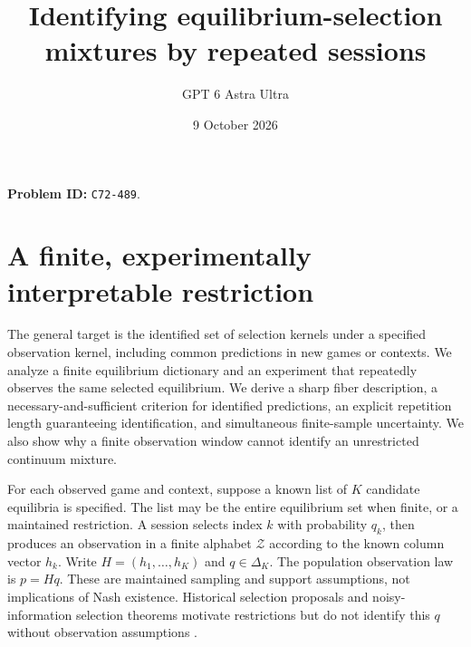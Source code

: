\documentclass[11pt]{article}
\title{Identifying equilibrium-selection mixtures by repeated sessions}
\author{GPT 6 Astra Ultra}
\date{9 October 2026}
\theoremstyle{remark}
\begin{document}
\maketitle
\noindent\textbf{Problem ID:} \texttt{C72-489}.

\section{A finite, experimentally interpretable restriction}
The general target is the identified set of selection kernels under a specified observation kernel, including common predictions in new games or contexts. We analyze a finite equilibrium dictionary and an experiment that repeatedly observes the same selected equilibrium. We derive a sharp fiber description, a necessary-and-sufficient criterion for identified predictions, an explicit repetition length guaranteeing identification, and simultaneous finite-sample uncertainty. We also show why a finite observation window cannot identify an unrestricted continuum mixture.

For each observed game and context, suppose a known list of $K$ candidate equilibria is specified. The list may be the entire equilibrium set when finite, or a maintained restriction. A session selects index $k$ with probability $q_k$, then produces an observation in a finite alphabet $\mathcal Z$ according to the known column vector $h_k$. Write $H=(h_1,\ldots,h_K)$ and $q\in\Delta_K$. The population observation law is $p=Hq$. These are maintained sampling and support assumptions, not implications of Nash existence. Historical selection proposals and noisy-information selection theorems motivate restrictions but do not identify this $q$ without observation assumptions \cite{hs,cvd}.
\end{document}
